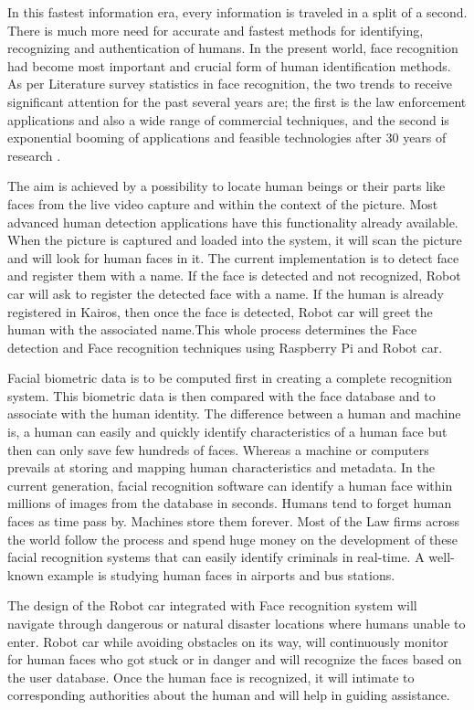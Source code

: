 \documentclass[sigconf]{acmart}
\begin{document}
In this fastest information era, every information is traveled in a split of a second. There is much more need for accurate and fastest methods for identifying, recognizing and authentication of humans. In the present world, face recognition had become most important and crucial form of human identification methods. As per Literature survey statistics in face recognition, the two trends to receive significant attention for the past several years are; the first is the law enforcement applications and also a wide range of commercial techniques, and the second is exponential booming of applications and feasible technologies after 30 years of research \cite{riddhi2013}.

The aim is achieved by a possibility to locate human beings or their parts like faces from the live video capture and within the context of the picture. Most advanced human detection applications have this functionality already available. When the picture is captured and loaded into the system, it will scan the picture and will look for human faces in it. The current implementation is to detect face and register them with a name. If the face is detected and not recognized, Robot car will ask to register the detected face with a name. If the human is already registered in Kairos, then once the face is detected, Robot car will greet the human with the associated name.This whole process determines the Face detection and Face recognition techniques using Raspberry Pi and Robot car.

Facial biometric data is to be computed first in creating a complete recognition system. This biometric data is then compared with the face database and to associate with the human identity. The difference between a human and machine is, a human can easily and quickly identify characteristics of a human face but then can only save few hundreds of faces. Whereas a machine or computers prevails at storing and mapping human characteristics and metadata. In the current generation, facial recognition software can identify a human face within millions of images from the database in seconds. Humans tend to forget human faces as time pass by. Machines store them forever. Most of the Law firms across the world follow the process and spend huge money on the development of these facial recognition systems that can easily identify criminals in real-time. A well-known example is studying human faces in airports and bus stations.

The design of the Robot car integrated with Face recognition system will navigate through dangerous or natural disaster locations where humans unable to enter. Robot car while avoiding obstacles on its way, will continuously monitor for human faces who got stuck or in danger and will recognize the faces based on the user database. Once the human face is recognized, it will intimate to corresponding authorities about the human and will help in guiding assistance. 
\end{document}
